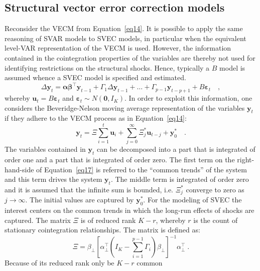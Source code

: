 \documentclass[nojss]{jss}
\begin{document}
\subsection{Structural vector error correction models}
\label{subsec:svec}
Reconsider the VECM from Equation~\ref{eq14}. It is possible to
apply the same reasoning of SVAR models to SVEC models, in particular
when the equivalent level-VAR representation of the VECM is
used. However, the information contained in the cointegration
properties of the variables are thereby not used for identifying
restrictions on the structural shocks. Hence, typically a $B$ model
is assumed whence a SVEC model is specified and estimated. 
\begin{equation}
\label{eq16}
\Delta \bm{y}_t = \bm{\alpha}\bm{\beta}^\top \bm{y}_{t-1} +
\Gamma_1 \Delta \bm{y}_{t-1} + \ldots + \Gamma_{p-1} \bm{y}_{t-p+1} +
B \bm{\varepsilon}_t \quad, 
\end{equation}  
\noindent whereby $\bm{u}_t = B \bm{\varepsilon}_t$ and
$\bm{\varepsilon}_t \sim N(\bm{0}, I_K)$.  
In order to exploit this information, one considers the Beveridge-Nelson moving
average representation of the variables $\bm{y}_t$ if they adhere to
the VECM process as in Equation~\ref{eq14}:
\begin{equation}
\label{eq17}
\bm{y}_t = \Xi \sum_{i = 1}^t \bm{u}_i + \sum_{j=0}^\infty
\Xi^*_j \bm{u}_{t-j} + \bm{y}_0^* \quad .   
\end{equation}
The variables contained in $\bm{y}_t$ can be decomposed into a part
that is integrated of order one and a part that is integrated of order
zero. The first term on the right-hand-side of Equation~\ref{eq17}
is referred to the ``common trends'' of the system and this term
drives the system $\bm{y}_t$. The middle term is integrated of order
zero and it is assumed that the infinite sum is bounded, i.e. $\Xi_j^*$
converge to zero as $ j \to \infty$. The initial values are captured by
$\bm{y}_0^*$. For the modeling of SVEC the interest centers on the
common trends in which the long-run effects of shocks are
captured. The matrix $\Xi$ is of reduced rank $K - r$, whereby $r$ is
the count of stationary cointegration relationships. The matrix is
defined as:
\begin{equation}
\label{eq18}
\Xi = \beta_{\perp} \left[ \alpha_\perp ^\top \left( I_K - \sum_{i=1}^{p-1}
\Gamma_i \right ) \beta_\perp \right]^{-1} \alpha_\perp ^\top \; .
\end{equation}
Because of its reduced rank only be $K-r$ common
\end{document}
